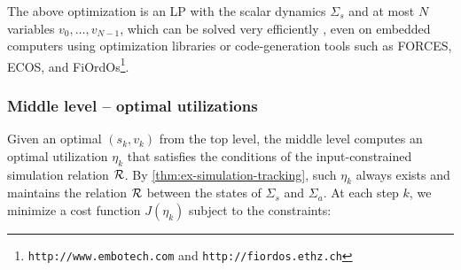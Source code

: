 The above optimization is an LP with the scalar dynamics $\Sigma_{s}$ and at most $N$ variables $v_{0},\dots,v_{N-1}$, which
can be solved very efficiently \cite{boydetal06co}, even on embedded computers using optimization libraries or code-generation tools such as FORCES, ECOS, and FiOrdOs\footnote{%
\texttt{http://www.embotech.com} and \texttt{http://fiordos.ethz.ch}}.


\subsubsection{Middle level -- optimal utilizations}

Given an optimal $(s_{k}, v_{k})$ from the top level, the middle level computes an optimal utilization $\eta_{k}$ that satisfies the conditions of the input-constrained simulation relation $\mathcal{R}$.
By \cref{thm:ex-simulation-tracking}, such $\eta_{k}$ always exists and maintains the relation $\mathcal{R}$ between the states of $\Sigma_{s}$ and $\Sigma_{a}$.
%
%
At each step $k$, we minimize a cost function $J(\eta_{k})$ subject to the constraints:
